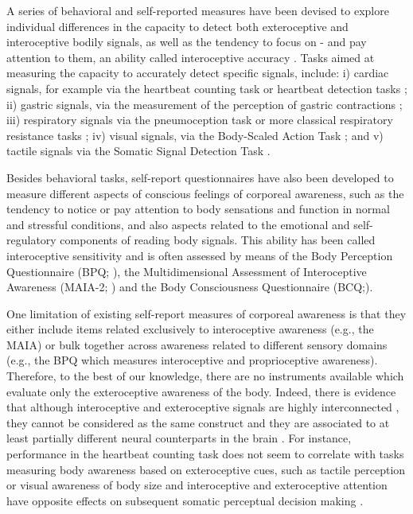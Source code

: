 \documentclass[man]{apa7}
\begin{document}
 A series of behavioral and self-reported measures have been devised to explore individual differences in the capacity to detect both exteroceptive and interoceptive bodily signals, as well as the tendency to focus on - and pay attention to them, an ability called interoceptive accuracy \parencite{garfinkel2015knowing}. Tasks aimed at measuring the capacity to accurately detect specific signals, include: i) cardiac signals, for example via the heartbeat counting task \parencite{schandry1981heart} or heartbeat detection tasks \parencite{azevedo2016participants,whitehead1977relation}; ii) gastric signals, via the measurement of the perception of gastric contractions \parencite{garfinkel2017investigation, herbert2012interoception,van2016water,whitehead1980perception}; iii) respiratory signals via the pneumoception task \parencite{monti2020embreathment} or more classical respiratory resistance tasks 
\parencite{garfinkel2016interoceptive,harver1993signal,steptoe1997perception}; iv) visual signals, via the Body-Scaled Action Task \parencite{guardia2010anticipation,valenzuela2017exteroceptive}; and v) tactile signals via the Somatic Signal Detection Task \parencite{durlik2014being}.
\par Besides behavioral tasks, self-report questionnaires have also been developed to measure different aspects of conscious feelings of corporeal awareness, such as the tendency to notice or pay attention to body sensations and function in normal and stressful conditions, and also aspects related to the emotional and self-regulatory components of reading body signals. This ability has been called interoceptive sensitivity \parencite{garfinkel2015knowing} and is often assessed by means of the Body Perception Questionnaire (BPQ; \Textcite {porges1993body}), the Multidimensional Assessment of Interoceptive Awareness (MAIA-2; \Textcite {mehling2018multidimensional}) and the Body Consciousness Questionnaire (BCQ;\Textcite{miller1981consciousness}).
\par One limitation of existing self-report measures of corporeal awareness is that they either include items related exclusively to interoceptive awareness (e.g., the MAIA) or bulk together across awareness related to different sensory domains (e.g., the BPQ which measures interoceptive and proprioceptive awareness). Therefore, to the best of our knowledge, there are no instruments available which evaluate only the exteroceptive awareness of the body. Indeed, there is evidence that although interoceptive and exteroceptive signals are highly interconnected \parencite{simmons2013keeping}, they cannot be considered as the same construct and they are associated to at least partially different neural counterparts in the brain \parencite{farb2013mindfulness,hurliman2005double}. For instance, performance in the heartbeat counting task does not seem to correlate with tasks measuring body awareness based on exteroceptive cues, such as tactile perception \parencite{durlik2014being} or visual awareness of body size \parencite{valenzuela2017exteroceptive}and interoceptive and exteroceptive attention have opposite effects on subsequent somatic perceptual decision making \parencite{mirams2012interoceptive}.
\end{document}
